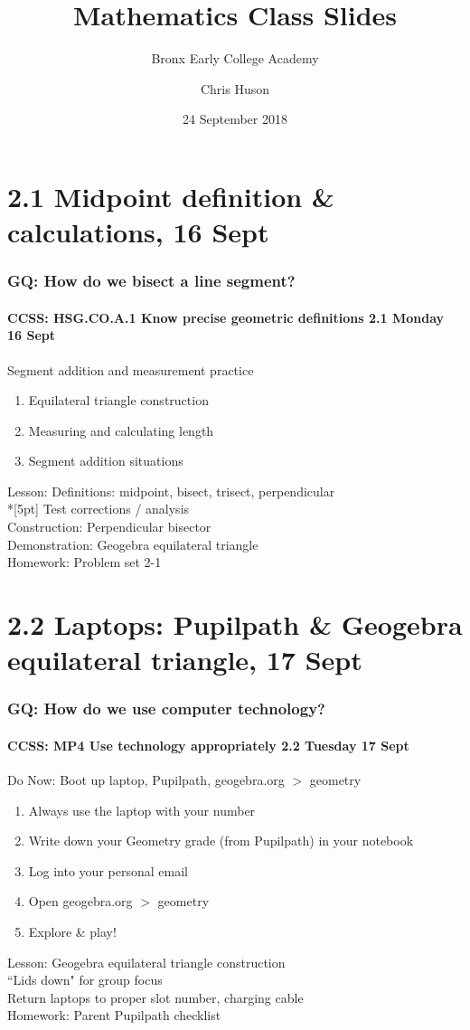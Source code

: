 \documentclass{beamer}
\title{Mathematics Class Slides}
\subtitle{Bronx Early College Academy}
\author{Chris Huson}
\date{24 September 2018}
\begin{document}
\frame{\titlepage}
\section[Outline]{}
\frame{\tableofcontents}

\section{2.1 Midpoint definition \& calculations, 16 Sept}
  \frame
  {
    \frametitle{GQ: How do we bisect a line segment?}
    \framesubtitle{CCSS: HSG.CO.A.1 Know precise geometric definitions \hfill \alert{2.1 Monday 16 Sept}}

    \begin{block}{Segment addition and measurement practice}
    \begin{enumerate}
      \item Equilateral triangle construction
      \item Measuring and calculating length
      \item Segment addition situations
    \end{enumerate}
    \end{block}
    Lesson: Definitions: midpoint, bisect, trisect, perpendicular \\*[5pt]
    Test corrections / analysis\\
    Construction: Perpendicular bisector\\
    Demonstration: Geogebra equilateral triangle\\ \smallskip
    Homework: Problem set 2-1 
  }

  \section{2.2 Laptops: Pupilpath \& Geogebra equilateral triangle, 17 Sept}
  \frame
  {
    \frametitle{GQ: How do we use computer technology?}
    \framesubtitle{CCSS: MP4 Use technology appropriately \hfill \alert{2.2 Tuesday 17 Sept}}
  
    \begin{block}{Do Now: Boot up laptop, Pupilpath, geogebra.org $>$ geometry}
    \begin{enumerate}
        \item Always use the laptop with your number
        \item Write down your Geometry grade (from Pupilpath) in your notebook
        \item Log into your personal email
        \item Open geogebra.org $>$ geometry
        \item Explore \& play!
    \end{enumerate}
    \end{block}
    Lesson: Geogebra equilateral triangle construction\\
    ``Lids down" for group focus \\
    Return laptops to proper slot number, charging cable \\ \vspace{0.25cm}
    Homework: Parent Pupilpath checklist
  }
\end{document}
